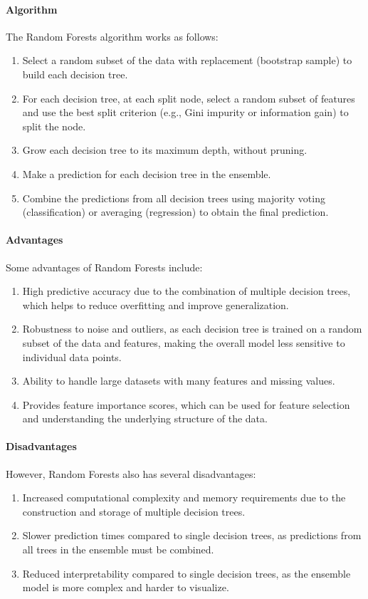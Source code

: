 \documentclass[12pt]{article}
\begin{document}
\paragraph{Algorithm}
The Random Forests algorithm works as follows:
\begin{enumerate}
\item Select a random subset of the data with replacement (bootstrap sample) to build each decision tree.
\item For each decision tree, at each split node, select a random subset of features and use the best split criterion (e.g., Gini impurity or information gain) to split the node.
\item Grow each decision tree to its maximum depth, without pruning.
\item Make a prediction for each decision tree in the ensemble.
\item Combine the predictions from all decision trees using majority voting (classification) or averaging (regression) to obtain the final prediction.
\end{enumerate}

\paragraph{Advantages}
Some advantages of Random Forests include:
\begin{enumerate}
\item High predictive accuracy due to the combination of multiple decision trees, which helps to reduce overfitting and improve generalization.
\item Robustness to noise and outliers, as each decision tree is trained on a random subset of the data and features, making the overall model less sensitive to individual data points.
\item Ability to handle large datasets with many features and missing values.
\item Provides feature importance scores, which can be used for feature selection and understanding the underlying structure of the data.
\end{enumerate}

\paragraph{Disadvantages}
However, Random Forests also has several disadvantages:
\begin{enumerate}
\item Increased computational complexity and memory requirements due to the construction and storage of multiple decision trees.
\item Slower prediction times compared to single decision trees, as predictions from all trees in the ensemble must be combined.
\item Reduced interpretability compared to single decision trees, as the ensemble model is more complex and harder to visualize.
\end{enumerate}
\end{document}

